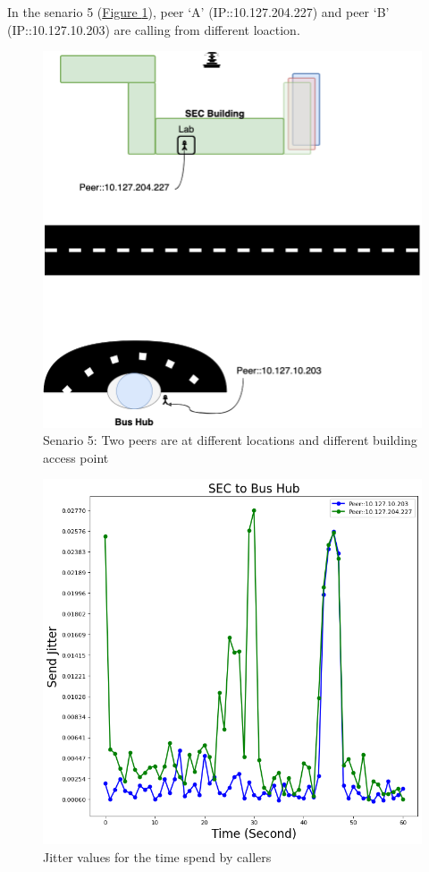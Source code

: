 	In the senario 5 (\hyperref[fig:scene-5]{Figure \ref{fig:scene-5}}), peer `A' (IP::10.127.204.227) and peer `B' (IP::10.127.10.203) are calling from different loaction.
	\begin{figure}[!bh]
		\begin{minipage}{\textwidth}
			\includegraphics[scale=0.29]{Images/experiment/senarios/bus_hub.drawio.png}
		\end{minipage}
		\caption{Senario 5: Two peers are at different locations and different building access point}
		\label{fig:scene-5}
	\end{figure}

	\begin{figure}[!t]
		\begin{minipage}{\textwidth}
			\includegraphics[scale=0.38]{Images/experiment/senarios/df_bus_hub.png}
		\end{minipage}
		\caption{Jitter values for the time spend by callers}
		\label{fig:scene-out-5}
	\end{figure}